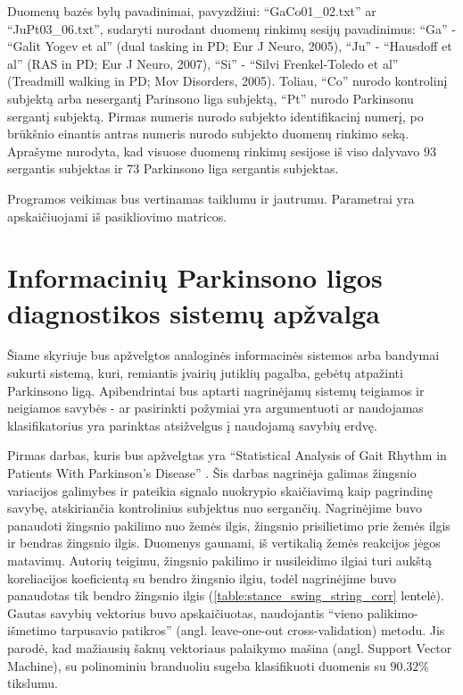 \documentclass[]{vgtuef}
\begin{document}
Duomenų bazės bylų pavadinimai, pavyzdžiui: ``GaCo01\_02.txt'' ar ``JuPt03\_06.txt'', sudaryti nurodant duomenų rinkimų sesijų pavadinimus: ``Ga'' - ``Galit Yogev et al'' (dual tasking in PD; Eur J Neuro, 2005), ``Ju'' - ``Hausdoff et al'' (RAS in PD; Eur J Neuro, 2007), ``Si'' - ``Silvi Frenkel-Toledo et al'' (Treadmill walking in PD; Mov Disorders, 2005). Toliau, ``Co'' nurodo kontrolinį subjektą arba nesergantį Parinsono liga subjektą, ``Pt'' nurodo Parkinsonu sergantį subjektą. Pirmas numeris nurodo subjekto identifikacinį numerį, po brūkšnio einantis antras numeris nurodo subjekto duomenų rinkimo seką. Aprašyme nurodyta, kad visuose duomenų rinkimų sesijose iš viso dalyvavo $93$ sergantis subjektas ir $73$ Parkinsono liga sergantis subjektas.

Programos veikimas bus vertinamas taiklumu ir jautrumu. Parametrai yra apskaičiuojami iš pasikliovimo matricos.

\section{Informacinių Parkinsono ligos diagnostikos sistemų apžvalga}

Šiame skyriuje bus apžvelgtos analoginės informacinės sistemos arba bandymai sukurti sistemą, kuri, remiantis įvairių jutiklių pagalba, gebėtų atpažinti Parkinsono ligą. Apibendrintai bus aptarti nagrinėjamų sistemų teigiamos ir neigiamos savybės - ar pasirinkti požymiai yra argumentuoti ar naudojamas klasifikatorius yra parinktas atsižvelgus į naudojamą savybių erdvę.


Pirmas darbas, kuris bus apžvelgtas yra ``Statistical Analysis of Gait Rhythm in Patients With Parkinson's Disease'' \cite{5280353}. Šis darbas nagrinėja galimas žingsnio variacijos galimybes ir pateikia signalo nuokrypio skaičiavimą kaip pagrindinę savybę, atskiriančia kontrolinius subjektus nuo sergančių. Nagrinėjime buvo panaudoti žingsnio pakilimo nuo žemės ilgis, žingsnio prisilietimo prie žemės ilgis ir bendras žingsnio ilgis. Duomenys gaunami, iš vertikalią žemės reakcijos jėgos matavimų. Autorių teigimu, žingsnio pakilimo ir nusileidimo ilgiai turi aukštą koreliacijos koeficientą su bendro žingsnio ilgiu, todėl nagrinėjime buvo panaudotas tik bendro žingsnio ilgis (\ref{table:stance_swing_string_corr} lentelė). Gautas savybių vektorius buvo apskaičiuotas, naudojantis ``vieno palikimo-išmetimo tarpusavio patikros'' (angl. leave-one-out cross-validation) metodu. Jis parodė, kad mažiausių šaknų vektoriaus palaikymo mašina (angl. Support Vector Machine), su polinominiu branduoliu sugeba klasifikuoti duomenis su $90.32 \%$ tikslumu. 
\end{document}
